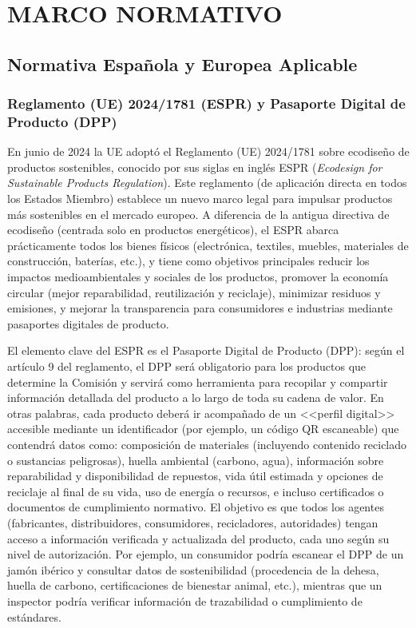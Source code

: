 \chapter{MARCO NORMATIVO}\label{ch:marco}

\section{Normativa Española y Europea Aplicable}\label{sec:marco-normativa}
\subsection{Reglamento (UE) 2024/1781 (ESPR) y Pasaporte Digital de Producto (DPP)}
En junio de 2024 la UE adoptó el Reglamento (UE) 2024/1781 sobre ecodiseño de productos sostenibles, conocido por sus siglas en inglés ESPR (\textit{Ecodesign for Sustainable Products Regulation}). Este reglamento (de aplicación directa en todos los Estados Miembro) establece un nuevo marco legal para impulsar productos más sostenibles en el mercado europeo. A diferencia de la antigua directiva de ecodiseño (centrada solo en productos energéticos), el ESPR abarca prácticamente todos los bienes físicos (electrónica, textiles, muebles, materiales de construcción, baterías, etc.), y tiene como objetivos principales reducir los impactos medioambientales y sociales de los productos, promover la economía circular (mejor reparabilidad, reutilización y reciclaje), minimizar residuos y emisiones, y mejorar la transparencia para consumidores e industrias mediante pasaportes digitales de producto. \cite{ReglamentoUE2024a}

El elemento clave del ESPR es el Pasaporte Digital de Producto (DPP): según el artículo 9 del reglamento, el DPP será obligatorio para los productos que determine la Comisión y servirá como herramienta para recopilar y compartir información detallada del producto a lo largo de toda su cadena de valor. En otras palabras, cada producto deberá ir acompañado de un <<perfil digital>> accesible mediante un identificador (por ejemplo, un código QR escaneable) que contendrá datos como: composición de materiales (incluyendo contenido reciclado o sustancias peligrosas), huella ambiental (carbono, agua), información sobre reparabilidad y disponibilidad de repuestos, vida útil estimada y opciones de reciclaje al final de su vida, uso de energía o recursos, e incluso certificados o documentos de cumplimiento normativo. El objetivo es que todos los agentes (fabricantes, distribuidores, consumidores, recicladores, autoridades) tengan acceso a información verificada y actualizada del producto, cada uno según su nivel de autorización. Por ejemplo, un consumidor podría escanear el DPP de un jamón ibérico y consultar datos de sostenibilidad (procedencia de la dehesa, huella de carbono, certificaciones de bienestar animal, etc.), mientras que un inspector podría verificar información de trazabilidad o cumplimiento de estándares.

